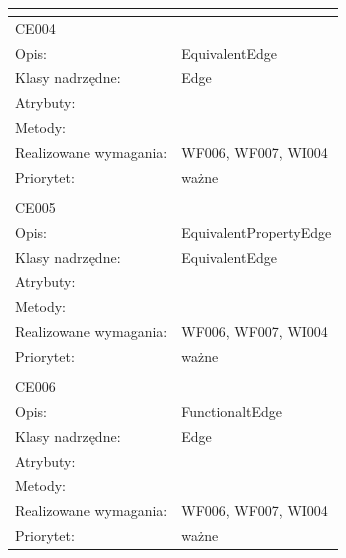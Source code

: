 \documentclass[a4paper,10pt]{article}
\begin{document}
\begin{center}
\begin{longtable}{|m{3cm}|m{9cm}|}
\multicolumn{2}{c}{} \\
 \hline

CE004 &  \\ \hline
Opis: & EquivalentEdge    \\ \hline
Klasy nadrzędne: & Edge    \\ \hline
Atrybuty: & %
 \\ \hline
Metody: & %
  \\ \hline
Realizowane wymagania: & WF006, WF007, WI004 \\ \hline
Priorytet: & ważne  \\ \hline

\multicolumn{2}{c}{} \\
 \hline

CE005 &  \\ \hline
Opis: & EquivalentPropertyEdge    \\ \hline
Klasy nadrzędne: & EquivalentEdge    \\ \hline
Atrybuty: & %
 \\ \hline
Metody: & %
  \\ \hline
Realizowane wymagania: & WF006, WF007, WI004 \\ \hline
Priorytet: & ważne  \\ \hline

\multicolumn{2}{c}{} \\
 \hline

CE006 &  \\ \hline
Opis: & FunctionaltEdge    \\ \hline
Klasy nadrzędne: & Edge    \\ \hline
Atrybuty: & %
 \\ \hline
Metody: & %
  \\ \hline
Realizowane wymagania: & WF006, WF007, WI004 \\ \hline
Priorytet: & ważne  \\ \hline


\end{longtable}
\end{center}
\end{document}

